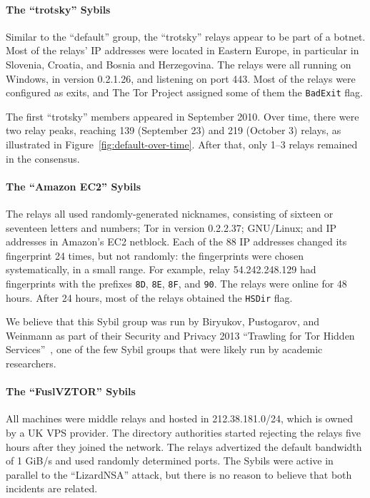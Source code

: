 \paragraph{The ``trotsky'' Sybils}
Similar to the ``default'' group, the ``trotsky'' relays appear to be part of
a botnet.  Most of the relays' IP addresses were located in Eastern Europe, in
particular in Slovenia, Croatia, and Bosnia and Herzegovina.  The relays were
all running on Windows, in version 0.2.1.26, and listening on port 443.  Most of
the relays were configured as exits, and The Tor Project assigned some of them
the \texttt{BadExit} flag.

The first ``trotsky'' members appeared in September 2010.  Over time, there were
two relay peaks, reaching 139 (September 23) and 219 (October 3) relays, as
illustrated in Figure~\ref{fig:default-over-time}.  After that, only 1--3 relays
remained in the consensus.

\paragraph{The ``Amazon EC2'' Sybils}
The relays all used randomly-generated nicknames, consisting of sixteen or
seventeen letters and numbers; Tor in version 0.2.2.37; GNU/Linux; and IP
addresses in Amazon's EC2 netblock.  Each of the 88 IP addresses changed its
fingerprint 24 times, but not randomly: the fingerprints were chosen
systematically, in a small range.  For example, relay 54.242.248.129 had
fingerprints with the prefixes \texttt{8D}, \texttt{8E}, \texttt{8F}, and
\texttt{90}.  The relays were online for 48 hours.  After 24 hours, most of the
relays obtained the \texttt{HSDir} flag.

We believe that this Sybil group was run by Biryukov, Pustogarov, and Weinmann
as part of their Security and Privacy 2013 ``Trawling for Tor Hidden
Services''~\cite{Biryukov2013a}, one of the few Sybil groups that were likely
run by academic researchers.

\paragraph{The ``FuslVZTOR'' Sybils}
All machines were middle relays and hosted in 212.38.181.0/24, which is owned by
a UK VPS provider.  The directory authorities started rejecting the relays five
hours after they joined the network.  The relays advertized the default bandwidth
of 1 GiB/s and used randomly determined ports.  The Sybils were active in
parallel to the ``LizardNSA'' attack, but there is no reason to believe that
both incidents are related.

